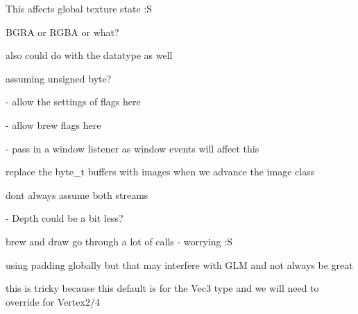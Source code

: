 \begin{DoxyRefList}
\-This affects global texture state \-:\-S 

\-B\-G\-R\-A or \-R\-G\-B\-A or what? 

also could do with the datatype as well  
\item[\label{todo__todo000005}%
\hypertarget{todo__todo000005}{}%
\-Member \hyperlink{classs9_1_1gl_1_1TextureStream_af480e3b1df190227d46215955824dcc0}{s9\-:\-:gl\-:\-:\-Texture\-Stream\-:\-:\-Texture\-Stream} (size\-\_\-t width, size\-\_\-t height, \-Colour\-Component format=\-R\-G\-B, \-Colour\-Type type=\-U\-N\-S\-I\-G\-N\-E\-D\-\_\-\-B\-Y\-T\-E, const byte\-\_\-t $\ast$data=nullptr)]assuming unsigned byte?  
\item[\label{todo__todo000006}%
\hypertarget{todo__todo000006}{}%
\-Member \hyperlink{classs9_1_1Node_ab88c83ced58700a56de568f5b1e3c473}{s9\-:\-:\-Node\-:\-:draw} ()]-\/ allow the settings of flags here 

-\/ allow brew flags here  
\item[\label{todo__todo000008}%
\hypertarget{todo__todo000008}{}%
\-Member \hyperlink{classs9_1_1oculus_1_1OculusBase_a574e05f1890877cd2eb77f8fbbd9c553}{s9\-:\-:oculus\-:\-:\-Oculus\-Base\-:\-:\-Oculus\-Base} (bool b)]-\/ pass in a window listener as window events will affect this  
\item[\label{todo__todo000020}%
\hypertarget{todo__todo000020}{}%
\-Class \hyperlink{classs9_1_1oni_1_1OpenNIBase}{s9\-:\-:oni\-:\-:\-Open\-N\-I\-Base} ]replace the byte\-\_\-t buffers with images when we advance the image class  
\item[\label{todo__todo000009}%
\hypertarget{todo__todo000009}{}%
\-Member \hyperlink{classs9_1_1oni_1_1OpenNIBase_a466d4d6f769490e0703490004d7e9dcc}{s9\-:\-:oni\-:\-:\-Open\-N\-I\-Base\-:\-:\-Open\-N\-I\-Base} (const char $\ast$device\-U\-R\-I)]dont always assume both streams  
\item[\label{todo__todo000021}%
\hypertarget{todo__todo000021}{}%
\-Member \hyperlink{classs9_1_1oni_1_1OpenNIBase_1_1SharedObj_a95bcc43c79c432a446a88784ff5d1cc4}{s9\-:\-:oni\-:\-:\-Open\-N\-I\-Base\-:\-:\-Shared\-Obj\-:\-:tex\-\_\-buffer\-\_\-colour\-\_\-} ]-\/ \-Depth could be a bit less?  
\item[\label{todo__todo000026}%
\hypertarget{todo__todo000026}{}%
\-Class \hyperlink{classs9_1_1Shape}{s9\-:\-:\-Shape} ]brew and draw go through a lot of calls -\/ worrying \-:\-S  
\item[\label{todo__todo000024}%
\hypertarget{todo__todo000024}{}%
\-Class \hyperlink{structs9_1_1VertexT}{s9\-:\-:\-Vertex\-T$<$ \-T, \-U $>$} ]using padding globally but that may interfere with \-G\-L\-M and not always be great 

this is tricky because this default is for the \-Vec3 type and we will need to override for \-Vertex2/4 
\end{DoxyRefList}